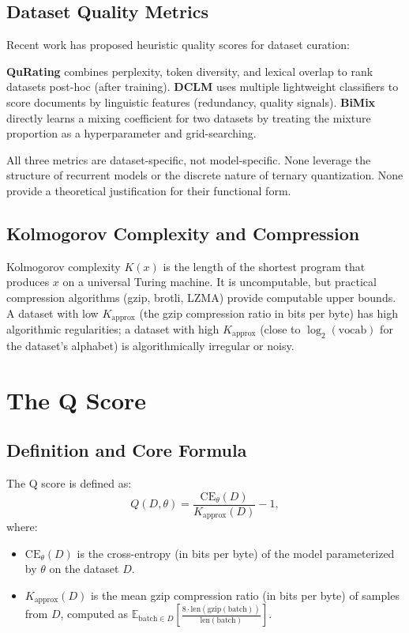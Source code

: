 \documentclass{article}
\begin{document}
\subsection{Dataset Quality Metrics}

Recent work has proposed heuristic quality scores for dataset curation:

\textbf{QuRating} \citep{qurating2024} combines perplexity, token diversity, and lexical overlap to rank datasets post-hoc (after training). \textbf{DCLM} \citep{dclm2024} uses multiple lightweight classifiers to score documents by linguistic features (redundancy, quality signals). \textbf{BiMix} \citep{bimix2025} directly learns a mixing coefficient for two datasets by treating the mixture proportion as a hyperparameter and grid-searching.

All three metrics are dataset-specific, not model-specific. None leverage the structure of recurrent models or the discrete nature of ternary quantization. None provide a theoretical justification for their functional form.

\subsection{Kolmogorov Complexity and Compression}

Kolmogorov complexity $K(x)$ is the length of the shortest program that produces $x$ on a universal Turing machine. It is uncomputable, but practical compression algorithms (gzip, brotli, LZMA) provide computable upper bounds. A dataset with low $K_{\mathrm{approx}}$ (the gzip compression ratio in bits per byte) has high algorithmic regularities; a dataset with high $K_{\mathrm{approx}}$ (close to $\log_2(\mathrm{vocab})$ for the dataset's alphabet) is algorithmically irregular or noisy.

\section{The Q Score}

\subsection{Definition and Core Formula}

The Q score is defined as:
\begin{equation}
  Q(D, \theta) = \frac{\mathrm{CE}_\theta(D)}{K_{\mathrm{approx}}(D)} - 1,
\label{eq:q_formula}
\end{equation}
where:
\begin{itemize}
  \item $\mathrm{CE}_\theta(D)$ is the cross-entropy (in bits per byte) of the model parameterized by $\theta$ on the dataset $D$.
  \item $K_{\mathrm{approx}}(D)$ is the mean gzip compression ratio (in bits per byte) of samples from $D$, computed as $\mathbb{E}_{\mathrm{batch} \in D}[\frac{8 \cdot \mathrm{len}(\mathrm{gzip}(\mathrm{batch}))}{\mathrm{len}(\mathrm{batch})}]$.
\end{itemize}
\end{document}
